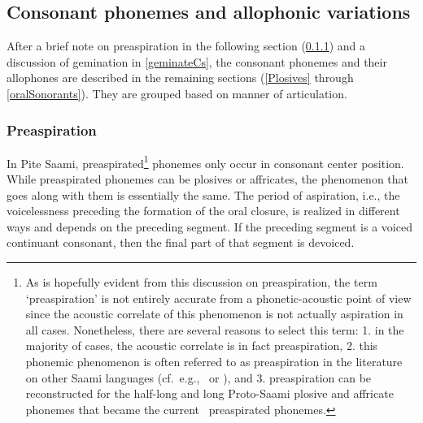 
\subsection{Consonant phonemes and allophonic variations}\label{Callophones}
After a brief note on preaspiration in the following section (\SEC\ref{preaspiration}) and a discussion of gemination in \SEC\ref{geminateCs}, the consonant phonemes and their allophones are described in the remaining sections (\SEC\ref{Plosives} through \SEC\ref{oralSonorants}). They are grouped based on manner of articulation.


\subsubsection{Preaspiration}\label{preaspiration}\noindent
In Pite Saami, preaspirated\footnote{As is hopefully evident from this discussion on preaspiration, the term ‘preaspiration’ is not entirely accurate from a phonetic-acoustic point of view since the acoustic correlate of this phenomenon is not actually aspiration in all cases. Nonetheless, there are several reasons to select this term: 1. in the majority of cases, the acoustic correlate is in fact preaspiration, 2. this phonemic phenomenon is often referred to as preaspiration in the literature on %
other Saami languages (cf.~e.g.,~\citealt[54-55]{Sammallahti1998} %
or \citealt[57,67]{Feist2010}), and 3. preaspiration can be reconstructed for the half-long and long Proto-Saami plosive and affricate phonemes \citep[cf.][54]{Sammallahti1998} that became the current \PS\ preaspirated phonemes.} 
phonemes only occur in consonant center position. While preaspirated phonemes can be plosives or affricates, the phenomenon that goes along with them is essentially the same. %
The period of aspiration, i.e., the voicelessness preceding the formation of the oral closure, is realized in different ways and depends on the preceding segment. If the preceding segment is a voiced continuant %
consonant, then the final part of that segment is devoiced. 

